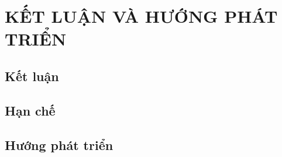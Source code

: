 \chapter{KẾT LUẬN VÀ HƯỚNG PHÁT TRIỂN}
\label{chap:ketluan}

\section{Kết luận}

\section{Hạn chế}

\section{Hướng phát triển}
